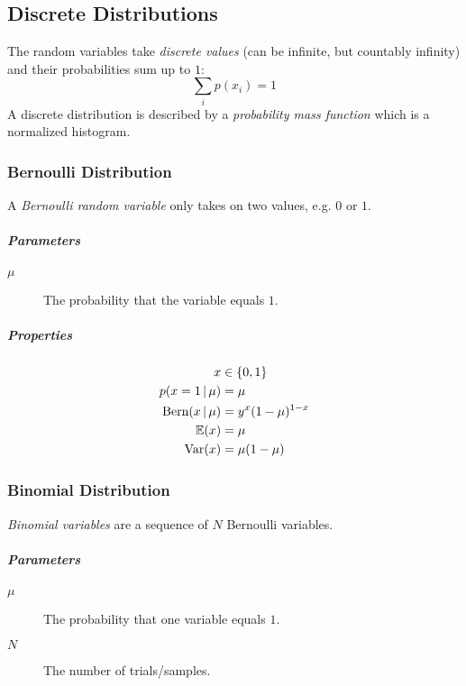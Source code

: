 		\subsection{Discrete Distributions}
			The random variables take \emph{discrete values} (can be infinite, but countably infinity) and their probabilities sum up to \(1\):
			\begin{equation}
				\sum_i p(x_i) = 1
			\end{equation}
			A discrete distribution is described by a \emph{probability mass function} which is a normalized histogram.

			\subsubsection{Bernoulli Distribution}
				A \emph{Bernoulli random variable} only takes on two values, e.g. \(0\) or \(1\).

				\subparagraph{Parameters}
					\begin{description}
						\item[\(\mu\)] The probability that the variable equals \(1\).
					\end{description}

				\subparagraph{Properties}
					\begin{align}
						x                           & \in \{ 0, 1 \}        \\
						p(x = 1 \,\vert\, \mu)         & = \mu                 \\
						\textrm{Bern}(x \,\vert\, \mu) & = y^x (1 - \mu)^{1-x} \\
						\mathbb{E}(x)                       & = \mu                 \\
						\operatorname{Var}(x)                     & = \mu(1 - \mu)
					\end{align}

			\subsubsection{Binomial Distribution}
				\emph{Binomial variables} are a sequence of \(N\) Bernoulli variables.

				\subparagraph{Parameters}
					\begin{description}
						\item [\(\mu\)] The probability that one variable equals \(1\).
						\item [\(N\)] The number of trials/samples.
					\end{description}

